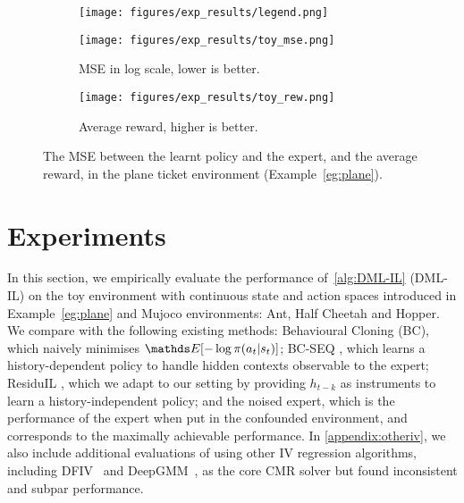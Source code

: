 
\begin{figure*}[t]
\begin{subfigure}[t]{1\textwidth}
\centering\texttt{[image: figures/exp\_results/legend.png]}
\end{subfigure}
\centering
\begin{subfigure}[t]{0.38\textwidth}
\centering
\texttt{[image: figures/exp\_results/toy\_mse.png]}
\caption{MSE in log scale, lower is better.}
\end{subfigure}
\begin{subfigure}[t]{0.38\textwidth}
\centering
\texttt{[image: figures/exp\_results/toy\_rew.png]}
\caption{Average reward, higher is better.}
\end{subfigure}
\caption{The MSE between the learnt policy and the expert, and the average reward, in the plane ticket environment (Example~\ref{eg:plane}).}
\label{fig:toy}
\end{figure*}

\section{Experiments}\label{sec:exps}


In this section, we empirically evaluate the performance of~\cref{alg:DML-IL} (DML-IL) on the toy environment with continuous state and action spaces introduced in Example~\ref{eg:plane} and Mujoco environments: Ant, Half Cheetah and Hopper. We compare with the following existing methods: Behavioural Cloning (BC), which naively minimises $\expectE[-\log\pi(a_t\lvert s_t)]$; BC-SEQ \citep{Swamy2022}, which learns a history-dependent policy to handle hidden contexts observable to the expert; ResiduIL \citep{Swamy2022_temporal}, which we adapt to our setting by providing $h_{t-k}$ as instruments to learn a history-independent policy; 
and the noised expert, which is the performance of the expert when put in the confounded environment, and corresponds to the maximally achievable performance. In \cref{appendix:otheriv}, we also include additional evaluations of using other IV regression algorithms, including DFIV~\citep{Xu2020} and DeepGMM~\citep{Bennett2019DeepAnalysis}, as the core CMR solver but found inconsistent and subpar performance. 

